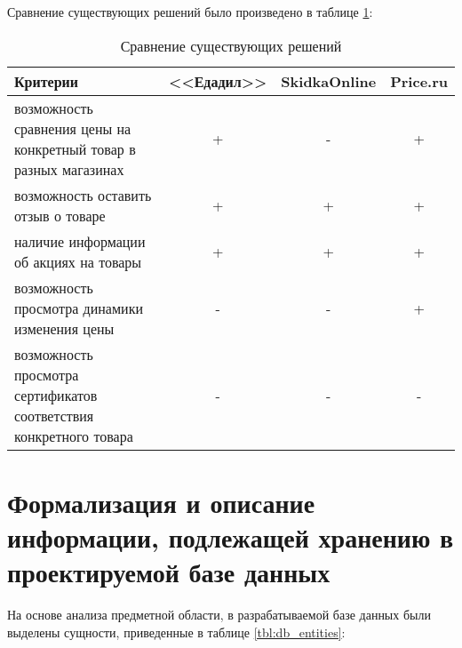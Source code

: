 Сравнение существующих решений было произведено в таблице \ref{tbl:exist_sol}:

\begin{table}[ht]
	\begin{center}
		\begin{threeparttable}
			\caption{Сравнение существующих решений}
			\label{tbl:exist_sol}
			\begin{tabular}{|p{7cm}|c|c|c|}
				\hline
				\textbf{Критерии} & <<Едадил>> & SkidkaOnline & Price.ru \\
				\hline
				возможность сравнения цены на конкретный товар в разных магазинах & + & - & + \\
				\hline
				возможность оставить отзыв о товаре & + & + & + \\
				\hline
				наличие информации об акциях на товары & + & + & + \\
				\hline
				возможность просмотра динамики изменения цены & - & - & + \\
				\hline
				возможность просмотра сертификатов соответствия конкретного товара & - & - & - \\
				\hline
			\end{tabular}
		\end{threeparttable}			
	\end{center}
\end{table}

\section{Формализация и описание информации, подлежащей хранению в проектируемой базе данных}

На основе анализа предметной области, в разрабатываемой базе данных были выделены сущности, приведенные в таблице \ref{tbl:db_entities}: 

